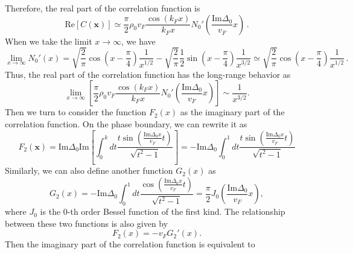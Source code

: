 \documentclass[aps,prl,twocolumn,superscriptaddress]{revtex4-1}
\begin{document}
\begin{bibunit}
Therefore, the real part of the correlation function is
\begin{equation}
	\mathrm{Re}[C(\bm{x})]\simeq\frac{\pi}{2} \rho_0v_F \frac{\cos (k_F x)}{k_Fx} N_0' \left( \frac{\text{Im}
		\Delta_0}{v_F} x \right)\,.
\end{equation}
When we take the limit $x \rightarrow \infty$, we have
\begin{equation}
	\lim_{x \rightarrow \infty} N_0' (x) = \sqrt{\frac{2}{\pi}} \cos \left( x -
	\frac{\pi}{4} \right) \frac{1}{x^{1 / 2}} - \sqrt{\frac{2}{\pi}} \frac{1}{2}
	\sin \left( x - \frac{\pi}{4} \right) \frac{1}{x^{3 / 2}} \simeq 
	\sqrt{\frac{2}{\pi}} \cos \left( x - \frac{\pi}{4} \right) \frac{1}{x^{1 /
			2}}\,.
	\label{Realexact}
\end{equation}
Thus, the real part of the correlation function has the long-range behavior as
\begin{equation}
	\lim_{x \rightarrow \infty} \left[  \frac{\pi}{2} \rho_0 v_F \frac{\cos (k_F x)}{k_Fx}
	N_0' \left( \frac{\text{Im} \Delta_0}{v_F} x \right) \right] \sim \frac{1}{x^{3 / 2}}.
\end{equation}
Then we turn to consider the function $F_2(x)$ as the imaginary part of the correlation function. On the phase boundary, we can rewrite it as
\begin{equation}
	F_2(\bm{x})=\text{Im}\Delta_0\text{Im}\left[\int_0^{k} dt \frac{t\sin ( \frac{\text{Im}\Delta_0x}{v_F}
		t )}{ \sqrt{t^2 - 1}}\right]=-\text{Im}\Delta_0\int_0^{1} dt \frac{t\sin ( \frac{\text{Im}\Delta_0x}{v_F}
		t )}{ \sqrt{t^2 - 1}}
	\label{definition_of_F2}
\end{equation}
Similarly, we can also define another function $G_2(x)$ as
\begin{equation}
	G_2(x)=-\text{Im}\Delta_0\int_0^{1} dt \frac{\cos ( \frac{\text{Im}\Delta_0x}{v_F}
		t )}{ \sqrt{t^2 - 1}}=\frac{\pi}{2} J_0 \left( \frac{\text{Im}\Delta_0}{v_F} x \right),
\end{equation}
where $J_0$ is the 0-th order Bessel function of the first kind. The relationship between these two functions is also given by
\begin{equation}
	F_2 (x) = - v_F G_2' (x). %
\end{equation}
Then the imaginary part of the correlation function is equivalent to

\end{bibunit}
\end{document}
